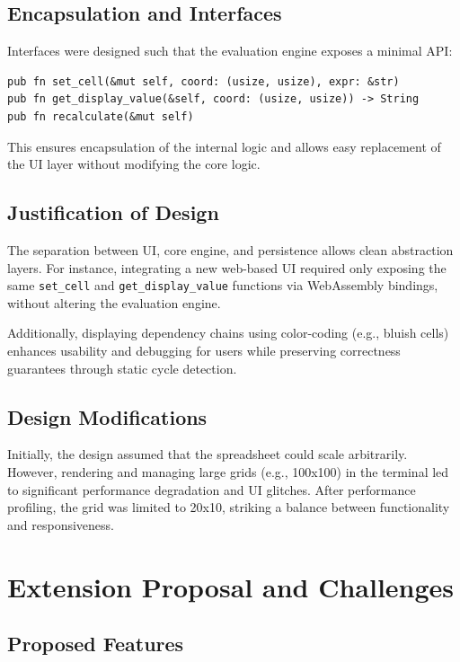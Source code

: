 \documentclass[11pt]{article}
\begin{document}
\subsection{Encapsulation and Interfaces}

Interfaces were designed such that the evaluation engine exposes a minimal API:
\begin{lstlisting}[basicstyle=\ttfamily, backgroundcolor=\color{gray!10}, frame=single]
pub fn set_cell(&mut self, coord: (usize, usize), expr: &str)
pub fn get_display_value(&self, coord: (usize, usize)) -> String
pub fn recalculate(&mut self)
\end{lstlisting}

This ensures encapsulation of the internal logic and allows easy replacement of the UI layer without modifying the core logic.

\subsection{Justification of Design}

The separation between UI, core engine, and persistence allows clean abstraction layers. For instance, integrating a new web-based UI required only exposing the same \texttt{set\_cell} and \texttt{get\_display\_value} functions via WebAssembly bindings, without altering the evaluation engine.

Additionally, displaying dependency chains using color-coding (e.g., bluish cells) enhances usability and debugging for users while preserving correctness guarantees through static cycle detection.

\subsection{Design Modifications}

Initially, the design assumed that the spreadsheet could scale arbitrarily. However, rendering and managing large grids (e.g., 100x100) in the terminal led to significant performance degradation and UI glitches. After performance profiling, the grid was limited to 20x10, striking a balance between functionality and responsiveness.

\section{Extension Proposal and Challenges}

\subsection{Proposed Features}
\end{document}
